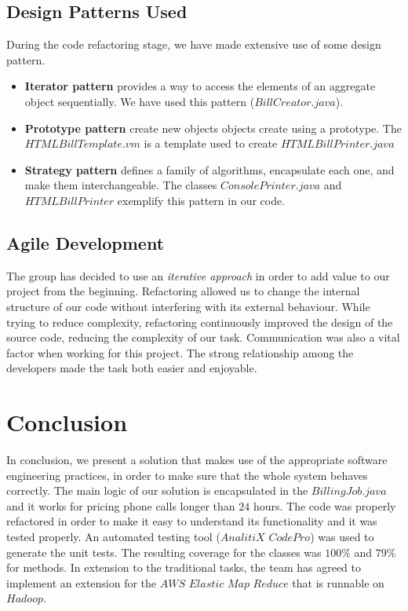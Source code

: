 \documentclass[11pt,twocolumn]{article} %
\begin{document}
\subsection{Design Patterns Used}
During the code refactoring stage, we have made extensive use of some design pattern.
\begin{itemize}
\item{{\bf Iterator pattern} provides a way to access the elements of an aggregate object sequentially. We have used this pattern ($BillCreator.java$).}
\item{{\bf Prototype pattern}  create new objects objects create using a prototype. The $HTMLBillTemplate.vm$ is a template used to create $HTMLBillPrinter.java$}
\item{{\bf Strategy pattern} defines a family of algorithms, encapsulate each one, and make them interchangeable. The classes $ConsolePrinter.java$ and $HTMLBillPrinter$ exemplify this pattern in our code.}
\end{itemize}


\subsection{Agile Development}
The group has decided to use an \emph{iterative approach} in order to add value to our project from the beginning. 
Refactoring allowed us to change the internal structure of our code without interfering with its external behaviour. While trying to reduce complexity, refactoring continuously improved the design of the source code, reducing the complexity of our task.
Communication was also a vital factor when working for this project. The strong relationship among the developers made the task both 
easier and enjoyable.

\section{Conclusion}
In conclusion, we present a solution that makes use of the appropriate software engineering practices, in order to 
make sure that the whole system behaves correctly.
The main logic of our solution is encapsulated in the $BillingJob.java$ and it works for pricing phone calls longer than $24$ hours. 
The code was properly refactored in order to make it easy to understand its functionality and it was tested properly.
An automated testing tool ($AnalitiX$ $CodePro$) was used to generate the unit tests.
The resulting coverage for the classes was $100\%$ and $79\%$ for methods.
In extension to the traditional tasks, the team has agreed to implement an extension for the $AWS$ $Elastic$ $Map$ $Reduce$ that is runnable on $Hadoop$.
\end{document}
